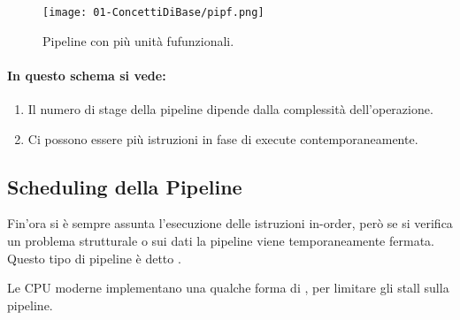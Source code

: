 \begin{figure}[h]
    \centering
    \texttt{[image: 01-ConcettiDiBase/pipf.png]}
    \caption{Pipeline con più unità fufunzionali.}
\end{figure}

\paragraph{ In questo schema si vede:} 

\begin{enumerate}
  \item Il numero di stage della pipeline dipende dalla complessità dell'operazione. 
  \item Ci possono essere più istruzioni in fase di execute contemporaneamente.
\end{enumerate}

\subsection{Scheduling della Pipeline}

Fin'ora si è sempre assunta l'esecuzione delle istruzioni in-order, però se si verifica un problema strutturale o sui dati la pipeline viene temporaneamente fermata. Questo tipo di pipeline è detto . 

Le CPU moderne implementano una qualche forma di , per limitare gli stall sulla pipeline.








